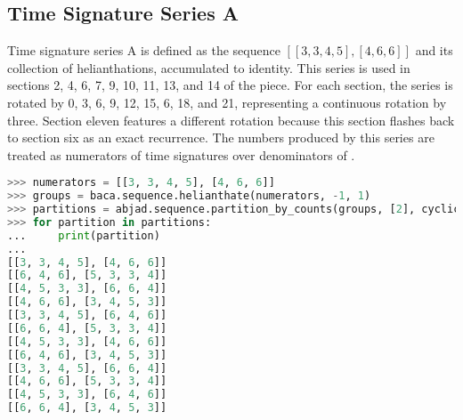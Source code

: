 \subsection{Time Signature Series A}

Time signature series A is defined as the sequence $[[3, 3, 4, 5], [4, 6, 6]]$ and its collection of helianthations, accumulated to identity. This series is used in sections 2, 4, 6, 7, 9, 10, 11, 13, and 14 of the piece. For each section, the series is rotated by 0, 3, 6, 9, 12, 15, 6, 18, and 21, representing a continuous rotation by three. Section eleven features a different rotation because this section flashes back to section six as an exact recurrence. The numbers produced by this series are treated as numerators of time signatures over denominators of .

\begin{lstlisting}[language=Python,frame=tb,caption={Enumeration of helianthated rotations of time signature series A},label=lst:sigs-a]
>>> numerators = [[3, 3, 4, 5], [4, 6, 6]]
>>> groups = baca.sequence.helianthate(numerators, -1, 1)
>>> partitions = abjad.sequence.partition_by_counts(groups, [2], cyclic=True)
>>> for partition in partitions:
...     print(partition)
...
[[3, 3, 4, 5], [4, 6, 6]]
[[6, 4, 6], [5, 3, 3, 4]]
[[4, 5, 3, 3], [6, 6, 4]]
[[4, 6, 6], [3, 4, 5, 3]]
[[3, 3, 4, 5], [6, 4, 6]]
[[6, 6, 4], [5, 3, 3, 4]]
[[4, 5, 3, 3], [4, 6, 6]]
[[6, 4, 6], [3, 4, 5, 3]]
[[3, 3, 4, 5], [6, 6, 4]]
[[4, 6, 6], [5, 3, 3, 4]]
[[4, 5, 3, 3], [6, 4, 6]]
[[6, 6, 4], [3, 4, 5, 3]]
\end{lstlisting}

